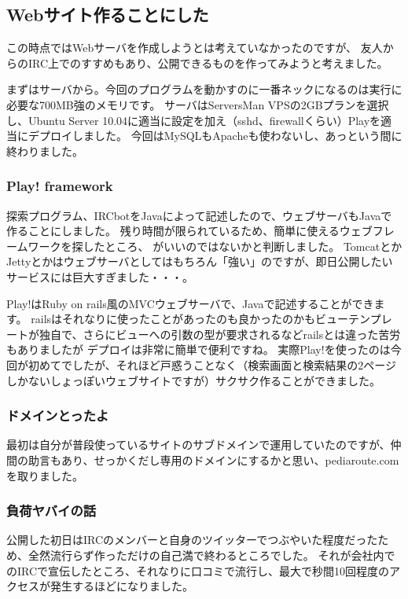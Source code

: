 \subsection{Webサイト作ることにした}
この時点ではWebサーバを作成しようとは考えていなかったのですが、
友人からのIRC上でのすすめもあり、公開できるものを作ってみようと考えました。

まずはサーバから。今回のプログラムを動かすのに一番ネックになるのは実行に必要な700MB強のメモリです。
サーバはServersMan VPSの2GBプランを選択し、Ubuntu Server 10.04に適当に設定を加え（sshd、firewallくらい）Playを適当にデプロイしました。
今回はMySQLもApacheも使わないし、あっという間に終わりました。

\subsubsection{Play! framework}
探索プログラム、IRCbotをJavaによって記述したので、ウェブサーバもJavaで作ることにしました。
残り時間が限られているため、簡単に使えるウェブフレームワークを探したところ、
がいいのではないかと判断しました。
TomcatとかJettyとかはウェブサーバとしてはもちろん「強い」のですが、即日公開したいサービスには巨大すぎました・・・。

Play!はRuby on rails風のMVCウェブサーバで、Javaで記述することができます。
railsはそれなりに使ったことがあったのも良かったのかもビューテンプレートが独自で、さらにビューへの引数の型が要求されるなどrailsとは違った苦労もありましたが
デプロイは非常に簡単で便利ですね。
実際Play!を使ったのは今回が初めてでしたが、それほど戸惑うことなく（検索画面と検索結果の2ページしかないしょっぽいウェブサイトですが）サクサク作ることができました。

\subsubsection{ドメインとったよ}
最初は自分が普段使っているサイトのサブドメインで運用していたのですが、仲間の助言もあり、せっかくだし専用のドメインにするかと思い、pediaroute.comを取りました。

\subsubsection{負荷ヤバイの話}
公開した初日はIRCのメンバーと自身のツイッターでつぶやいた程度だったため、全然流行らず作っただけの自己満で終わるところでした。
それが会社内でのIRCで宣伝したところ、それなりに口コミで流行し、最大で秒間10回程度のアクセスが発生するほどになりました。

